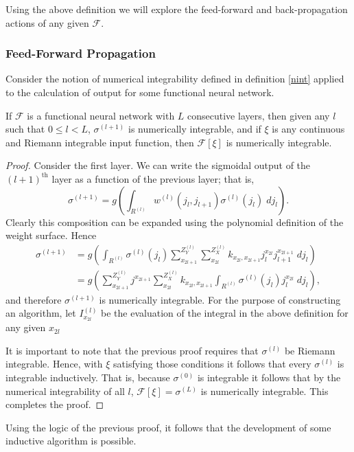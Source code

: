 Using the above definition we will explore the feed-forward and back-propagation actions of any given $\mathcal{F}$.












\subsubsection{Feed-Forward Propagation}

Consider the notion of numerical integrability defined in definition \ref{nint} applied to the calculation of output for some functional neural network.

\begin{theorem}
If $\mathcal{F}$ is a functional neural network with $L$ consecutive layers, then given any $l$ such that $0\leq l <  L$, $\sigma^{(l+1)}$ is numerically integrable, and if $\xi$ is any continuous and Riemann integrable input function, then $\mathcal{F}[\xi]$ is numerically integrable.
\end{theorem}

\begin{proof}
Consider the first layer. We can write the sigmoidal output of the $(l+1)^{\mathrm{th}}$ layer as a function of the previous layer; that is,
\begin{equation}
\sigma^{(l+1)} = g\left(\int_{R^{(l)}} w^{(l)}(j_l, j_{l+1})\sigma^{(l)}(j_{l})\; dj_{l}\right).
\end{equation}
Clearly this composition can be expanded using the polynomial definition of the weight surface. Hence
\begin {equation}
\begin{aligned}
\sigma^{(l+1)} &= g\left(\int_{R^{(l)}}\sigma^{(l)}(j_l)\sum_{x_{2l+1}}^{Z^{(l)}_Y}\sum_{x_{2l}}^{Z^{(l)}_X}{k_{x_{2l},x_{2l+1}}j_l^{x_{2l}}j_{l+1}^{x_{2l+1}}\;dj_l}\right) \\
&= g\left(\sum_{x_{2l+1}}^{Z^{(l)}_Y}j^{x_{2l+1}}\sum_{x_{2l}}^{Z^{(l)}_X}{k_{x_{2l},x_{2l+1}}}\int_{R^{(l)}} \sigma^{(l)}(j_l)j_l^{x_{2l}}\; dj_l\right),
\end{aligned}
\end{equation}
and therefore $\sigma^{(l+1)}$ is numerically integrable. For the purpose of constructing an algorithm, let $I^{(l)}_{x_{2l}}$ be the evaluation of the integral in the above definition for any given $x_{2l}$

It is important to note that the previous proof requires that $\sigma^{(l)}$ be Riemann integrable. Hence, with $\xi$ satisfying those conditions it follows that every $\sigma^{(l)}$ is integrable inductively. That is, because $\sigma^{(0)}$ is integrable it follows that by the numerical integrability of all $l$, $\mathcal{F}[\xi] = \sigma^{(L)}$ is numerically integrable. This completes the proof.
\end{proof}
Using the logic of the previous proof, it follows that the development of some inductive algorithm is possible. 

